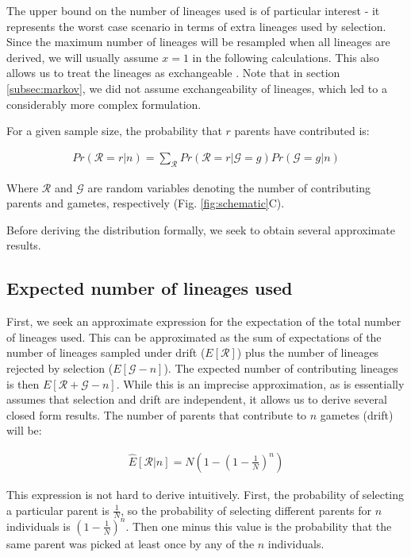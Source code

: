 \documentclass[review]{elsarticle}
\begin{document}
The upper bound on the number of lineages used is of particular interest - it represents the worst
case scenario in terms of extra lineages used by selection. Since the maximum number of lineages
will be resampled when all lineages are derived, we will usually assume $x=1$ in the following
calculations. This also allows us to treat the lineages as exchangeable \citep{Wakeley2009}. Note
that in section \ref{subsec:markov}, we did not assume exchangeability of lineages, which led to a
considerably more complex formulation.

For a given sample size, the probability that $r$ parents have contributed is:

\begin{align}
  \label{eq:conditional}
  Pr(\mathcal{R}=r|n) = \sum_{\mathcal{R}}Pr(\mathcal{R}=r|\mathcal{G}=g)Pr(\mathcal{G}=g|n)
\end{align}

Where $\mathcal{R}$ and $\mathcal{G}$ are random variables denoting the number of contributing
parents and gametes, respectively (Fig. \ref{fig:schematic}C).

Before deriving the distribution formally, we seek to obtain several approximate results.

\subsection{Expected number of lineages used}
\label{subsec:exp-number}

First, we seek an approximate expression for the expectation of the total number of lineages used.
This can be approximated as the sum of expectations of the number of lineages sampled under drift
($E[\mathcal{R}]$) plus the number of lineages rejected by selection ($E[\mathcal{G}-n]$). The
expected number of contributing lineages is then $E[\mathcal{R} + \mathcal{G} - n]$. While this is
an imprecise approximation, as is essentially assumes that selection and drift are independent, it
allows us to derive several closed form results. The number of parents that contribute to $n$
gametes (drift) will be:

\begin{align}
  \label{eq:drift-expectation}
  \hat{E}[\mathcal{R}|n] = N(1-\left( 1 - \frac{1}{N} \right)^n)
\end{align}

This expression is not hard to derive intuitively. First, the probability of selecting a particular
parent is $\frac{1}{N}$, so the probability of selecting different parents for $n$ individuals is
$(1-\frac{1}{N})^n$. Then one minus this value is the probability that the same parent was picked at
least once by any of the $n$ individuals.
\end{document}
